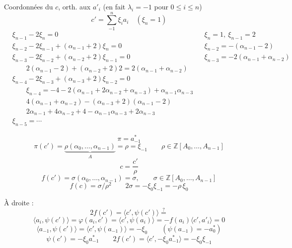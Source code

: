 \documentclass[11pt,a4paper]{article}
\begin{document}
Coordonnées  du $c$, orth. aux $a'_i$ (en fait
$\lambda_i = -1$ pour $0 \leqslant i \leqslant n$)
\[
c' = \sum_{-1}^{n} \xi_i a_i \quad (\xi_n = 1)
\]
\[
\begin{aligned}
&\xi_{n-1} - 2\xi_n = 0
&& \boxed{\xi_n = 1,\ \xi_{n-1} = 2} \\
&\xi_{n-2} - 2\xi_{n-1} + (\alpha_{n-1} + 2)\xi_n = 0
&& \boxed{\xi_{n-2} = -(\alpha_{n-1} - 2)} \\
&\xi_{n-3} - 2\xi_{n-2} + (\alpha_{n-2} + 2)\xi_{n-1} = 0
&& \boxed{\xi_{n-3} = -2(\alpha_{n-1} + \alpha_{n-2})} \\
&\qquad 2(\alpha_{n-1} - 2) + (\alpha_{n-2} + 2)2 = 2(\alpha_{n-1} + \alpha_{n-2}) \\
&\xi_{n-4} - 2\xi_{n-3} + (\alpha_{n-3} + 2)\xi_{n-2} = 0
\\
&\qquad \boxed{\xi_{n-4} = -4 - 2(\alpha_{n-1} + 2\alpha_{n-2} + \alpha_{n-3})
+ \alpha_{n-1}\alpha_{n-3}} \\
&\qquad 4(\alpha_{n-1} + \alpha_{n-2}) - (\alpha_{n-3} + 2)(\alpha_{n-1} - 2) \\
&\qquad 2\alpha_{n-1} + 4\alpha_{n-2} + 4 - \alpha_{n-1}\alpha_{n-3} + 2\alpha_{n-3} \\
&\xi_{n-5} = \cdots
\end{aligned}
\]

\[
\pi = a^{*}_{-1}
\]
\[
\pi(c') = \underbrace{\rho(\alpha_0, \ldots, \alpha_{n-1})}_{A} = \rho = \xi_{-1}
\qquad \rho \in \mathbb{Z}[A_0, \ldots, A_{n-1}]
\]
\[
c = \frac{c'}{\rho}
\]
\[
f(c') = \sigma(\alpha_0, \ldots, \alpha_{n-1}) = \sigma, \qquad
\sigma \in \mathbb{Z}[A_0, \ldots, A_{n-1}]
\]
\[
f(c) = \sigma / \rho^2 \qquad 2\sigma = -\xi_0 \xi_{-1} = -\rho\,\xi_0
\]

À droite :
\[
2f(c') = \langle c', \psi(c') \rangle \overset{?}{=}
\]
\[
\langle a_i, \psi(c') \rangle = \varphi(a_i, c') = \langle c', \psi(a_i) \rangle
= -f(a_i) \langle c', a'_i \rangle = 0
\]
\[
\langle a_{-1}, \psi(c') \rangle = \langle c', \psi(a_{-1}) \rangle = -\xi_0
\qquad (\psi(a_{-1}) = -a^{*}_0)
\]
\[
\psi(c') = -\xi_0 a^{*}_{-1}
\qquad
2f(c') = \langle c', -\xi_0 a^{*}_{-1} \rangle = -\xi_0 \xi_{-1}
\]
\end{document}
